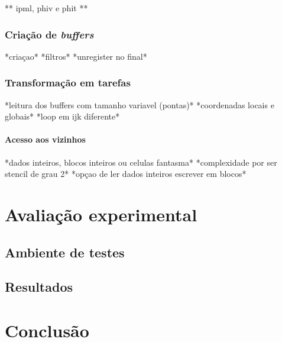 \documentclass[cic,tc]{iiufrgs}
\begin{document}
** ipml, phiv e phit **

\subsection{Criação de \textit{buffers}}

*criaçao*
*filtros*
*unregister no final*

\subsection{Transformação em tarefas}
*leitura dos buffers com tamanho variavel (pontas)*
*coordenadas locais e globais*
*loop em ijk diferente*

\subsubsection{Acesso aos vizinhos}
*dados inteiros, blocos inteiros ou celulas fantasma*
*complexidade por ser stencil de grau 2*
*opçao de ler dados inteiros escrever em blocos*

\chapter{Avaliação experimental}
\section{Ambiente de testes}
\section{Resultados}

\chapter{Conclusão}

% 
\end{document}
